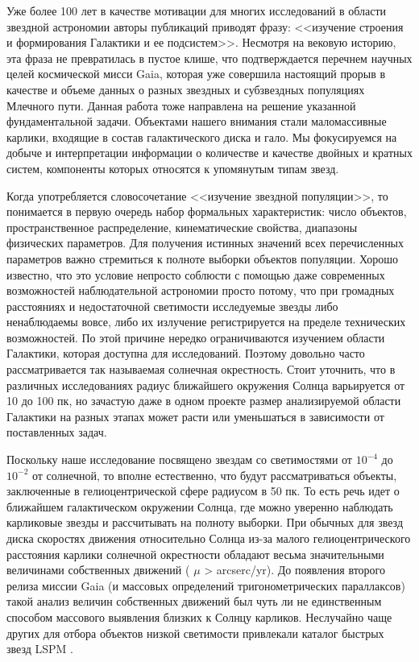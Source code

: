 
{\actuality} Уже более 100 лет в качестве мотивации для многих исследований в области звездной астрономии авторы публикаций приводят фразу: <<изучение строения и формирования Галактики и ее подсистем>>. Несмотря на вековую историю, эта фраза не превратилась в пустое клише, что подтверждается перечнем научных целей космической мисси Gaia, которая уже совершила настоящий прорыв в качестве и объеме данных о разных звездных и субзвездных популяциях Млечного пути. Данная работа тоже направлена на решение указанной фундаментальной задачи. Объектами нашего внимания стали маломассивные карлики, входящие в состав галактического диска и гало. Мы фокусируемся на добыче и интерпретации информации о количестве и качестве двойных и кратных систем, компоненты которых относятся к упомянутым типам звезд.

Когда употребляется словосочетание <<изучение звездной популяции>>, то понимается в первую очередь набор формальных характеристик: число объектов, пространственное распределение, кинематические свойства, диапазоны физических параметров. Для получения истинных значений всех перечисленных параметров важно стремиться к полноте выборки объектов популяции. Хорошо известно, что это условие непросто соблюсти с помощью даже современных возможностей наблюдательной астрономии просто потому, что при громадных расстояниях и недостаточной светимости исследуемые звезды либо ненаблюдаемы вовсе, либо их излучение регистрируется на пределе технических возможностей. По этой причине нередко ограничиваются изучением области Галактики, которая доступна для исследований. Поэтому довольно часто рассматривается так называемая солнечная окрестность. Стоит уточнить, что в различных исследованиях радиус ближайшего окружения  Солнца варьируется от 10 до 100 пк, но зачастую даже в одном проекте размер анализируемой области Галактики на разных этапах может расти или уменьшаться в зависимости от поставленных задач.

Поскольку наше исследование посвящено звездам со светимостями от $10^{-4}$ до $10^{-2}$ от солнечной, то вполне естественно, что будут рассматриваться объекты, заключенные в гелиоцентрической сфере радиусом в 50 пк. То есть речь идет о ближайшем галактическом окружении Солнца, где можно уверенно наблюдать карликовые звезды и рассчитывать на полноту выборки. При обычных для звезд диска скоростях движения относительно Солнца из-за малого гелиоцентрического расстояния карлики солнечной окрестности обладают весьма значительными величинами собственных движений ( $\mu$ > arcserc/yr). До появления второго релиза миссии Gaia (и массовых определений тригонометрических параллаксов) такой анализ величин собственных движений был чуть ли не единственным способом массового выявления близких к Солнцу карликов. Неслучайно чаще других для отбора объектов низкой светимости привлекали каталог быстрых звезд LSPM . 
 
